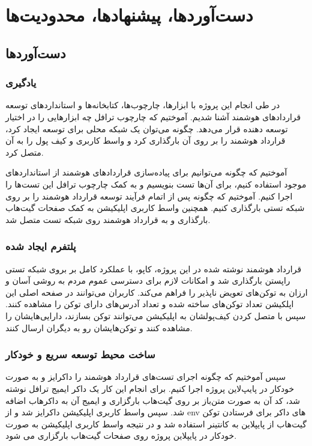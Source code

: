 \chapter{دست‌آوردها، پیشنهاد‌ها، محدودیت‌ها}

\section{دست‌آوردها}

\subsection{یادگیری}
در طی انجام این پروژه با ابزارها، چارچوب‌ها، کتابخانه‌ها و استانداردهای توسعه قراردادهای هوشمند آشنا شدیم. آموختیم که چارچوب ترافل چه ابزارهایی را در اختیار توسعه دهنده قرار می‌دهد. چگونه می‌توان یک شبکه محلی برای توسعه ایجاد کرد، قرارداد هوشمند را بر روی آن بارگذاری کرد و واسط کاربری و کیف پول را به آن متصل کرد.

آموختیم که چگونه می‌توانیم برای پیاده‌سازی قراردادهای هوشمند از استانداردهای موجود استفاده کنیم، برای آن‌ها تست بنویسیم و به کمک چارچوب ترافل این تست‌ها را اجرا کنیم. آموختیم که چگونه پس از اتمام فرآیند توسعه قرارداد هوشمند را بر روی شبکه تستی بارگذاری کنیم. همچنین واسط کاربری اپلیکیشن به کمک صفحات گیت‌هاب بارگذاری و به قرارداد هوشمند روی شبکه تست متصل شد.

\subsection{پلتفرم ایجاد شده}
قرارداد هوشمند نوشته شده در این پروژه، کاپو، با عملکرد کامل بر بروی شبکه تستی راپستن بارگذاری شد و امکانات لازم برای دسترسی عموم مردم به روشی آسان و ارزان به توکن‌های تعویض ناپذیر را فراهم می‌کند. کاربران می‌توانند در صفحه اصلی این اپلکیشن تعداد توکن‌های ساخته شده و تعداد آدرس‌های دارای توکن را مشاهده کنند. سپس با متصل کردن کیف‌پولشان به اپلیکیشن می‌توانند توکن بسازند، دارایی‌هایشان را مشاهده کنند و توکن‌هایشان رو به دیگران ارسال کنند.

\subsection{ساخت محیط توسعه سریع و خودکار}
سپس آموختیم که چگونه اجرای تست‌های قرارداد هوشمند را داکرایز و به صورت خودکار در پایپ‌لاین پروژه اجرا کنیم. برای انجام این کار یک داکر ایمیج ترافل نوشته شد، کد آن به صورت متن‌باز بر روی گیت‌هاب بارگزاری و ایمیج آن به داکرهاب اضافه شد. سپس واسط کاربری اپلیکیشن داکرایز شد و از env های داکر برای فرستادن توکن گیت‌هاب از پایپلاین به کانتینر استفاده شد و در نتیجه واسط کاربری اپلیکیشن به صورت خودکار در پایپلاین پروژه روی صفحات گیت‌هاب بارگزاری می شود.

